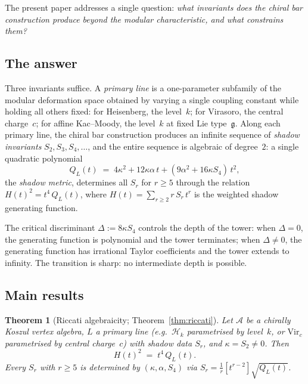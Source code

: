 \documentclass[11pt,reqno]{amsart}
\newtheorem{theorem}{Theorem}[section]
\theoremstyle{definition}
\theoremstyle{remark}
\newcommand{\cA}{\mathcal{A}}
\newcommand{\cH}{\mathcal{H}}
\newcommand{\fg}{\mathfrak{g}}
\newcommand{\Vir}{\mathrm{Vir}}
\numberwithin{equation}{section}
\begin{document}
The present paper addresses a single question: \emph{what
invariants does the chiral bar construction produce beyond
the modular characteristic, and what constrains them?}

\subsection{The answer}\label{subsec:intro-answer}

Three invariants suffice. A \emph{primary line} is a
one-parameter subfamily of the modular deformation space
obtained by varying a single coupling constant while holding
all others fixed: for Heisenberg, the level~$k$; for
Virasoro, the central charge~$c$; for affine Kac--Moody,
the level~$k$ at fixed Lie type~$\fg$. Along each primary
line, the chiral bar construction produces an infinite
sequence of \emph{shadow invariants}
$S_2, S_3, S_4, \ldots$, and the entire sequence is
algebraic of degree~$2$: a single quadratic polynomial
\[
 Q_L(t)
 \;=\;
 4\kappa^2 + 12\kappa\alpha\,t
 + (9\alpha^2 + 16\kappa S_4)\,t^2,
\]
the \emph{shadow metric}, determines all $S_r$ for $r \ge 5$
through the relation $H(t)^2 = t^4\, Q_L(t)$, where
$H(t) = \sum_{r \ge 2} r\, S_r\, t^r$ is the weighted
shadow generating function.

The critical discriminant $\Delta := 8\kappa S_4$ controls
the depth of the tower: when $\Delta = 0$, the generating
function is polynomial and the tower terminates; when
$\Delta \ne 0$, the generating function has irrational
Taylor coefficients and the tower extends to infinity.
The transition is sharp: no intermediate depth is
possible.

\subsection{Main results}\label{subsec:intro-results}

\begin{theorem}[Riccati algebraicity;
Theorem~\ref{thm:riccati}]\label{thm:intro-riccati}
Let $\cA$ be a chirally Koszul vertex algebra, $L$ a
primary line \textup{(}e.g.\ $\cH_k$ parametrised by level~$k$,
or $\Vir_c$ parametrised by central charge~$c$\textup{)} with
shadow data $S_r$, and $\kappa = S_2 \ne 0$. Then
\begin{equation}\label{eq:intro-algebraicity}
 H(t)^2 \;=\; t^4\,Q_L(t).
\end{equation}
Every $S_r$ with $r \ge 5$ is determined by
$(\kappa, \alpha, S_4)$ via
$S_r = \frac{1}{r}[t^{r-2}]\sqrt{Q_L(t)}$.
\end{theorem}
\end{document}
